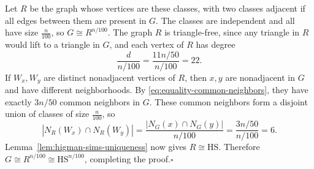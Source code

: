 Let $R$ be the graph whose vertices are these classes, with two
classes adjacent if all edges between them are present in $G$.
The classes are independent and all have size $\frac n{100}$, so $G\cong R^{n/100}$.
The graph $R$ is triangle-free, since any triangle in $R$ would lift
to a triangle in $G$, and each vertex of $R$ has degree
\[
\frac{d}{n/100}=\frac{11n/50}{n/100}=22.
\]
If $W_x,W_y$ are distinct nonadjacent vertices of $R$, then $x,y$
are nonadjacent in $G$ and have different neighborhoods.
By \eqref{eq:equality-common-neighbors}, they have exactly $3n/50$
common neighbors in $G$.
These common neighbors form a disjoint union of classes of size $\frac n{100}$,
so
\[
|N_R(W_x)\cap N_R(W_y)|
=\frac{|N_G(x)\cap N_G(y)|}{n/100}
=\frac{3n/50}{n/100}=6.
\]
Lemma~\ref{lem:higman-sims-uniqueness} now gives $R\cong \mathrm{HS}$.
Therefore $G\cong R^{n/100}\cong \mathrm{HS}^{n/100}$, completing the proof.\hfill$\square$
